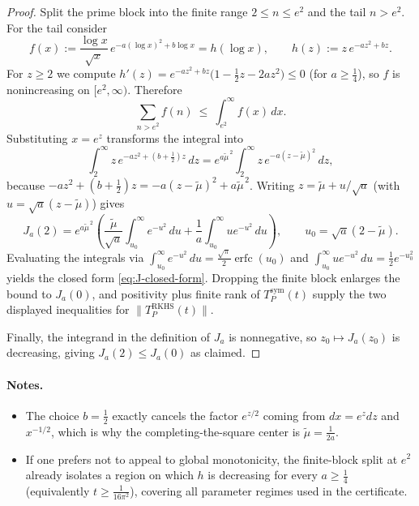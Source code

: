 \begin{proof}
Split the prime block into the finite range $2\le n\le e^2$ and the tail $n>e^2$. For the tail consider
\begin{equation}\label{eq:Prime_norm_leq_rho-formula-5}
  f(x) := \frac{\log x}{\sqrt{x}}\,e^{-a(\log x)^2 + b\log x}
  = h(\log x),\qquad h(z):= z\,e^{-a z^2 + b z}.
\end{equation}
For $z\ge 2$ we compute $h'(z)=e^{-a z^2 + b z}\bigl(1-\tfrac12 z-2a z^2\bigr)\le 0$ (for $a\ge \tfrac14$), so $f$ is nonincreasing on $[e^2,\infty)$. Therefore
\begin{equation}\label{eq:Prime_norm_leq_rho-formula-4}
  \sum_{n>e^2} f(n) \ \le\ \int_{e^2}^{\infty} f(x)\,dx.
\end{equation}
Substituting $x=e^{z}$ transforms the integral into
\begin{equation}\label{eq:Prime_norm_leq_rho-formula-3}
  \int_{2}^{\infty} z\,e^{-a z^2 + (b+\frac12)z}\,dz
  = e^{a\widetilde{\mu}^{\,2}} \int_{2}^{\infty} z\,e^{-a (z-\widetilde{\mu})^2}\,dz,
\end{equation}
because $-a z^2 + (b+\frac12)z = -a(z-\widetilde{\mu})^2 + a\widetilde{\mu}^{\,2}$. Writing $z = \widetilde{\mu} + u/\sqrt{a}$ (with $u = \sqrt{a}(z-\widetilde{\mu})$) gives
\begin{equation}\label{eq:Prime_norm_leq_rho-formula-2}
  J_a(2) = e^{a\widetilde{\mu}^{\,2}}\left(\frac{\widetilde{\mu}}{\sqrt{a}}\int_{u_0}^{\infty} e^{-u^2}\,du + \frac{1}{a}\int_{u_0}^{\infty} u e^{-u^2}\,du\right),
  \qquad u_0 = \sqrt{a}(2-\widetilde{\mu}).
\end{equation}
Evaluating the integrals via $\int_{u_0}^{\infty} e^{-u^2}\,du = \frac{\sqrt{\pi}}{2}\operatorname{erfc}(u_0)$ and $\int_{u_0}^{\infty} u e^{-u^2}\,du = \tfrac12 e^{-u_0^2}$ yields the closed form \eqref{eq:J-closed-form}. Dropping the finite block enlarges the bound to $J_a(0)$, and positivity plus finite rank of $T_P^{\mathrm{sym}}(t)$ supply the two displayed inequalities for $\|T_P^{\mathrm{RKHS}}(t)\|$.

Finally, the integrand in the definition of $J_a$ is nonnegative, so $z_0 \mapsto J_a(z_0)$ is decreasing, giving $J_a(2)\le J_a(0)$ as claimed.
\end{proof}

\paragraph{Notes.}
\begin{itemize}
  \item The choice $b=\tfrac12$ exactly cancels the factor $e^{z/2}$ coming from $dx=e^{z}dz$ and $x^{-1/2}$, which is why the completing-the-square center is $\widetilde{\mu}=\tfrac{1}{2a}$.
  \item If one prefers not to appeal to global monotonicity, the finite-block split at $e^{2}$ already isolates a region on which $h$ is decreasing for every $a\ge \tfrac14$ (equivalently $t\ge \tfrac{1}{16\pi^2}$), covering all parameter regimes used in the certificate.
\end{itemize}

